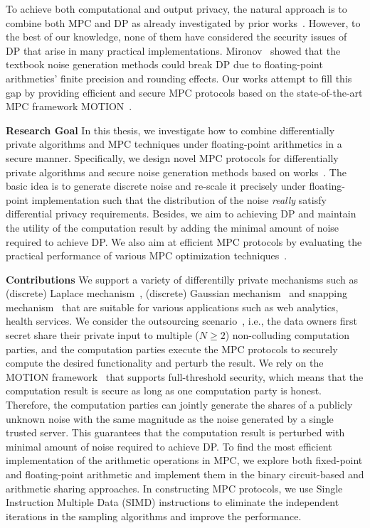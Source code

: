 To achieve both computational and output privacy, the natural approach is to combine both MPC and DP as already investigated by prior works~\cite{eigner2014differentially, pettai2015combining, byrd2020differentially}. However, to the best of our knowledge, none of them have considered the security issues of DP that arise in many practical implementations. Mironov~\cite{mironov2012significance} showed that the textbook noise generation methods could break DP due to floating-point arithmetics' finite precision and rounding effects. Our works attempt to fill this gap by providing efficient and secure MPC protocols based on the state-of-the-art MPC framework MOTION~\cite{braun2022motion}.

\textbf{Research Goal}
In this thesis, we investigate how to combine differentially private algorithms and MPC techniques under floating-point arithmetics in a secure manner. Specifically, we design novel MPC protocols for differentially private algorithms and secure noise generation methods based on works~\cite{mironov2012significance,googleDP2019,canonne2020discrete}. The basic idea is to generate discrete noise and re-scale it precisely under floating-point implementation such that the distribution of the noise \textit{really} satisfy differential privacy requirements. Besides, we aim to achieving DP and maintain the utility of the computation result by adding the minimal amount of noise required to achieve DP. We also aim at efficient MPC protocols by evaluating the practical performance of various MPC optimization techniques~\cite{braun2022motion}.

\textbf{Contributions}
We support a variety of differentilly private mechanisms such as (discrete) Laplace mechanism~\cite{chan2012privacy,ghosh2012universally,dwork2014algorithmic}, (discrete) Gaussian mechanism~\cite{dwork2014algorithmic, canonne2020discrete} and snapping mechanism~\cite{mironov2012significance} that are suitable for various applications such as web analytics, health services.
We consider the outsourcing scenario~\cite{kamara2011secure}, i.e., the data owners first secret share their private input to multiple ($N \geq 2$) non-colluding computation parties, and the computation parties execute the MPC protocols to securely compute the desired functionality and perturb the result. We rely on the MOTION framework~\cite{braun2022motion} that supports full-threshold security, which means that the computation result is secure as long as one computation party is honest. Therefore, the computation parties can jointly generate the shares of a publicly unknown noise with the same magnitude as the noise generated by a single trusted server.
This guarantees that the computation result is perturbed with minimal amount of noise required to achieve DP.
To find the most efficient implementation of the arithmetic operations in MPC, we explore both fixed-point and floating-point arithmetic and implement them in the binary circuit-based and arithmetic sharing approaches.
In constructing MPC protocols, we use Single Instruction Multiple Data (SIMD) instructions to eliminate the independent iterations in the sampling algorithms and improve the performance.

